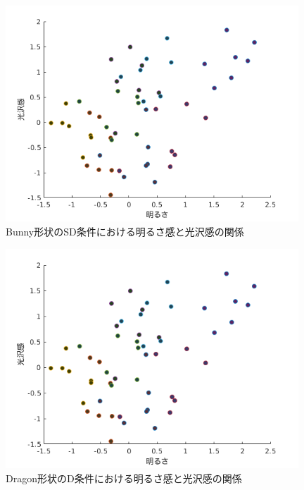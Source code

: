             \begin{figure}[h]
                \centering
                \includegraphics[width=11.0cm]{./img/ex3_BSD.png}
                \caption{Bunny形状のSD条件における明るさ感と光沢感の関係}
                \label{ex3_BSD}
            \end{figure}

            \newpage
            \begin{figure}[h]
                \centering
                \includegraphics[width=11.0cm]{./img/ex3_DD.png}
                \caption{Dragon形状のD条件における明るさ感と光沢感の関係}
                \label{ex3_DD}
            \end{figure}

